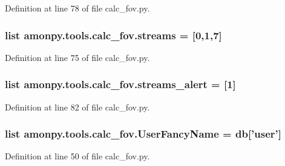 Definition at line 78 of file calc\-\_\-fov.\-py.

\hypertarget{namespaceamonpy_1_1tools_1_1calc__fov_a0d65e01c12947128d7aed9b6751a5159}{
\subsubsection[{streams}]{\setlength{\rightskip}{0pt plus 5cm}list amonpy.\-tools.\-calc\-\_\-fov.\-streams = \mbox{[}0,1,7\mbox{]}}}\label{namespaceamonpy_1_1tools_1_1calc__fov_a0d65e01c12947128d7aed9b6751a5159}


Definition at line 75 of file calc\-\_\-fov.\-py.

\hypertarget{namespaceamonpy_1_1tools_1_1calc__fov_a3bf1158446321df85f814bae76c9c168}{
\subsubsection[{streams\-\_\-alert}]{\setlength{\rightskip}{0pt plus 5cm}list amonpy.\-tools.\-calc\-\_\-fov.\-streams\-\_\-alert = \mbox{[}1\mbox{]}}}\label{namespaceamonpy_1_1tools_1_1calc__fov_a3bf1158446321df85f814bae76c9c168}


Definition at line 82 of file calc\-\_\-fov.\-py.

\hypertarget{namespaceamonpy_1_1tools_1_1calc__fov_ad6d8c3b48b201711ced879a1deb01343}{
\subsubsection[{User\-Fancy\-Name}]{\setlength{\rightskip}{0pt plus 5cm}list amonpy.\-tools.\-calc\-\_\-fov.\-User\-Fancy\-Name = {\bf db}\mbox{[}'user'\mbox{]}}}\label{namespaceamonpy_1_1tools_1_1calc__fov_ad6d8c3b48b201711ced879a1deb01343}


Definition at line 50 of file calc\-\_\-fov.\-py.

